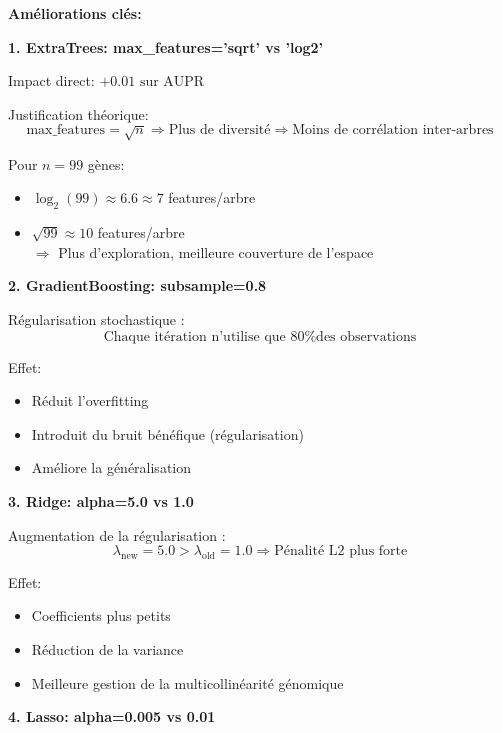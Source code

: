 \documentclass[12pt,a4paper,french]{article}
\begin{document}
\textbf{Améliorations clés:}

\textbf{1. ExtraTrees: max\_features='sqrt' vs 'log2'}

Impact direct: $\boxed{+0.01 \text{ sur AUPR}}$

Justification théorique:
\begin{equation}
\text{max\_features} = \sqrt{n} \Rightarrow \text{Plus de diversité} \Rightarrow \text{Moins de corrélation inter-arbres}
\end{equation}

Pour $n=99$ gènes:
\begin{itemize}
    \item $\log_2(99) \approx 6.6 \approx 7$ features/arbre
    \item $\sqrt{99} \approx 10$ features/arbre
    \\ $\Rightarrow$ Plus d'exploration, meilleure couverture de l'espace
\end{itemize}

\textbf{2. GradientBoosting: subsample=0.8}

Régularisation stochastique :
\begin{equation}
\text{Chaque itération n'utilise que 80\% des observations}
\end{equation}

Effet:
\begin{itemize}
    \item Réduit l'overfitting
    \item Introduit du bruit bénéfique (régularisation)
    \item Améliore la généralisation
\end{itemize}

\textbf{3. Ridge: alpha=5.0 vs 1.0}

Augmentation de la régularisation :
\begin{equation}
\lambda_{\text{new}} = 5.0 > \lambda_{\text{old}} = 1.0 \Rightarrow \text{Pénalité L2 plus forte}
\end{equation}

Effet:
\begin{itemize}
    \item Coefficients plus petits
    \item Réduction de la variance
    \item Meilleure gestion de la multicollinéarité génomique
\end{itemize}

\textbf{4. Lasso: alpha=0.005 vs 0.01}
\end{document}
